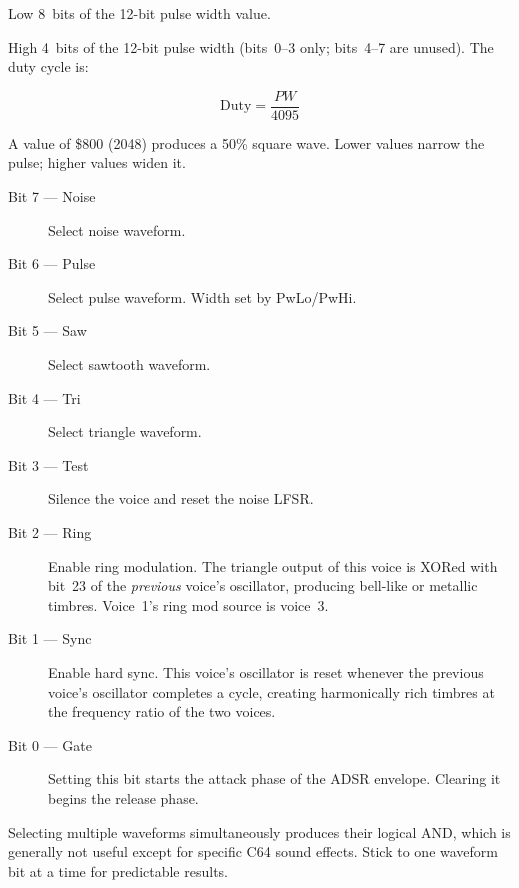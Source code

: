 

Low 8~bits of the 12-bit pulse width value.



High 4~bits of the 12-bit pulse width (bits~0--3 only; bits~4--7 are
unused).  The duty cycle is:

\[
  \text{Duty} = \frac{\mathit{PW}}{4095}
\]

A value of \$800 (2048) produces a 50\% square wave.  Lower values narrow
the pulse; higher values widen it.





\begin{description}
  \item[Bit 7 --- Noise] Select noise waveform.
  \item[Bit 6 --- Pulse] Select pulse waveform.  Width set by PwLo/PwHi.
  \item[Bit 5 --- Saw] Select sawtooth waveform.
  \item[Bit 4 --- Tri] Select triangle waveform.
  \item[Bit 3 --- Test] Silence the voice and reset the noise LFSR.
  \item[Bit 2 --- Ring] Enable ring modulation.  The triangle output of this
        voice is XORed with bit~23 of the \emph{previous} voice's oscillator,
        producing bell-like or metallic timbres.  Voice~1's ring mod source is
        voice~3.
  \item[Bit 1 --- Sync] Enable hard sync.  This voice's oscillator is reset
        whenever the previous voice's oscillator completes a cycle, creating
        harmonically rich timbres at the frequency ratio of the two voices.
  \item[Bit 0 --- Gate] Setting this bit starts the attack phase of the ADSR
        envelope.  Clearing it begins the release phase.
\end{description}

\begin{tipbox}
Selecting multiple waveforms simultaneously produces their logical AND,
which is generally not useful except for specific C64 sound effects.  Stick
to one waveform bit at a time for predictable results.
\end{tipbox}


